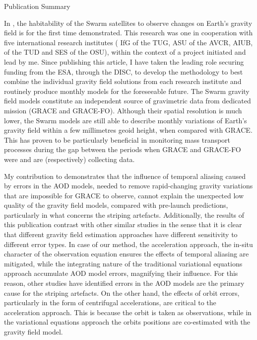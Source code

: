 
\begin{cvtext}{Publication Summary}

In \cite{TeixeiraEncarnacao2016}, the habitability of the Swarm satellites to observe changes on Earth's gravity field is for the first time demonstrated.
This research was one in cooperation with five international research institutes (
\acf{IfG} of the \acf{TUG},
\ac{ASU}  of the \acf{AVCR},
\acf{AIUB},
 of the \ac{TUD} and
\acf{SES} of the \acf{OSU}), 
within the context of a project initiated and lead by me.
Since publishing this article, I have taken the leading role securing funding from the \ac{ESA}, through the \ac{DISC}, to develop the methodology to best combine the individual gravity field solutions from each research institute and routinely produce monthly models for the foreseeable future. 
The Swarm gravity field models constitute an independent source of gravimetric data from dedicated mission (\ac{GRACE} and \ac{GRACE-FO}).
Although their spatial resolution is much lower, the Swarm models are still able to describe monthly variations of Earth's gravity field within a few millimetres geoid height, when compared with \ac{GRACE}.
This has proven to be particularly beneficial in monitoring mass transport processes during the gap between the periods when \ac{GRACE} and \ac{GRACE-FO} were and are (respectively) collecting data.

My contribution to \cite{Ditmar2012} demonstrates that the influence of temporal aliasing caused by errors in the \ac{AOD} models, needed to remove rapid-changing gravity variations that are impossible for \ac{GRACE} to observe, cannot explain the unexpected low quality of the gravity field models, compared with pre-launch predictions, particularly in what concerns the striping artefacts.
Additionally, the results of this publication contrast with other similar studies in the sense that it is clear that different gravity field estimation approaches have different sensitivity to different error types.
In case of our method, the acceleration approach, the in-situ character of the observation equation ensures the effects of temporal aliasing are mitigated, while the integrating nature of the traditional variational equations approach accumulate \ac{AOD} model errors, magnifying their influence.
For this reason, other studies have identified errors in the \ac{AOD} models are the primary cause for the striping artefacts.
On the other hand, the effects of orbit errors, particularly in the form of centrifugal accelerations, are critical to the acceleration approach.
This is because the orbit is taken as observations, while in the variational equations approach the orbits positions are co-estimated with the gravity field model.


\end{cvtext}
